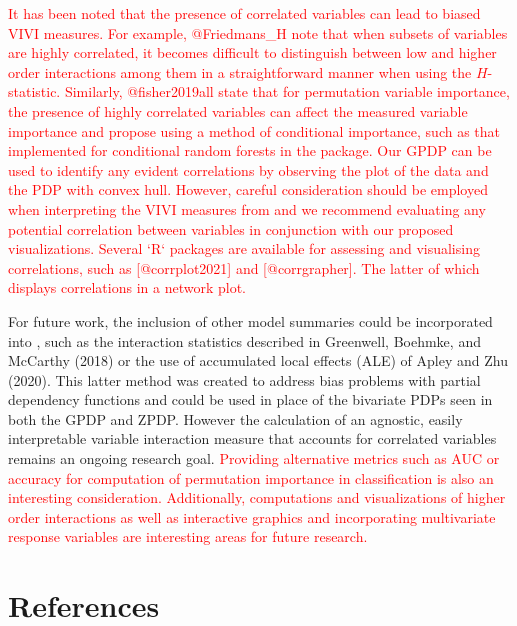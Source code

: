 \textcolor{red}{It has been noted that the presence of correlated variables can lead to biased VIVI measures. For example, @Friedmans\_H note that when subsets of variables are highly correlated, it becomes difficult to distinguish between low and higher order interactions among them in a straightforward manner when using the $H$-statistic. Similarly, @fisher2019all state that for permutation variable importance, the presence of highly correlated variables can affect the measured variable importance and propose using a method of conditional importance, such as that implemented for conditional random forests in the  package. Our GPDP can be used to identify any evident correlations by observing the plot of the data and the PDP with convex hull. However, careful consideration should be employed when interpreting the VIVI measures from  and we recommend evaluating any potential correlation between variables in conjunction with our proposed visualizations. Several `R` packages are available for assessing and visualising correlations, such as  [@corrplot2021] and   [@corrgrapher]. The latter of which displays correlations in a network plot.}

For future work, the inclusion of other model summaries could be incorporated into , such as the interaction statistics described in Greenwell, Boehmke, and McCarthy (2018) or the use of accumulated local effects (ALE) of Apley and Zhu (2020). This latter method was created to address bias problems with partial dependency functions and could be used in place of the bivariate PDPs seen in both the GPDP and ZPDP. However the calculation of an agnostic, easily interpretable variable interaction measure that accounts for correlated variables remains an ongoing research goal. \textcolor{red}{Providing alternative metrics such as AUC or accuracy for computation of permutation importance in classification is also an interesting consideration. Additionally, computations and visualizations of higher order interactions as well as interactive graphics and incorporating multivariate response variables are interesting areas for future research.}

\hypertarget{references}{%
\section*{References}\label{references}}

